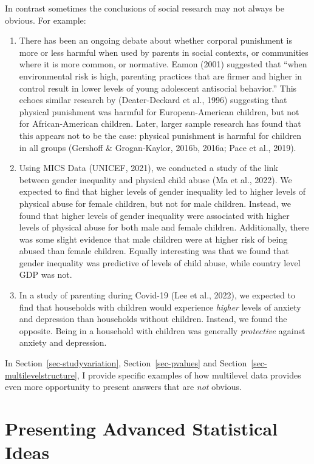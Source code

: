 \documentclass[
  letterpaper,
  DIV=11,
  numbers=noendperiod]{scrreprt}
\providecommand{\tightlist}{%
  \setlength{\itemsep}{0pt}\setlength{\parskip}{0pt}}\usepackage{longtable,booktabs,array}
\begin{document}
In contrast sometimes the conclusions of social research may not always
be obvious. For example:

\begin{enumerate}
\def\labelenumi{\arabic{enumi}.}
\tightlist
\item
  There has been an ongoing debate about whether corporal punishment is
  more or less harmful when used by parents in social contexts, or
  communities where it is more common, or normative. Eamon (2001)
  suggested that ``when environmental risk is high, parenting practices
  that are firmer and higher in control result in lower levels of young
  adolescent antisocial behavior.'' This echoes similar research by
  (Deater-Deckard et al., 1996) suggesting that physical punishment was
  harmful for European-American children, but not for African-American
  children. Later, larger sample research has found that this appears
  not to be the case: physical punishment is harmful for children in all
  groups (Gershoff \& Grogan-Kaylor, 2016b, 2016a; Pace et al., 2019).
\item
  Using MICS Data (UNICEF, 2021), we conducted a study of the link
  between gender inequality and physical child abuse (Ma et al., 2022).
  We expected to find that higher levels of gender inequality led to
  higher levels of physical abuse for female children, but not for male
  children. Instead, we found that higher levels of gender inequality
  were associated with higher levels of physical abuse for both male and
  female children. Additionally, there was some slight evidence that
  male children were at higher risk of being abused than female
  children. Equally interesting was that we found that gender inequality
  was predictive of levels of child abuse, while country level GDP was
  not.
\item
  In a study of parenting during Covid-19 (Lee et al., 2022), we
  expected to find that households with children would experience
  \emph{higher} levels of anxiety and depression than households without
  children. Instead, we found the opposite. Being in a household with
  children was generally \emph{protective} against anxiety and
  depression.
\end{enumerate}

In Section~\ref{sec-studyvariation}, Section~\ref{sec-pvalues} and
Section~\ref{sec-multilevelstructure}, I provide specific examples of
how multilevel data provides even more opportunity to present answers
that are \emph{not} obvious.

\hypertarget{presenting-advanced-statistical-ideas}{%
\section{Presenting Advanced Statistical
Ideas}\label{presenting-advanced-statistical-ideas}}
\end{document}
